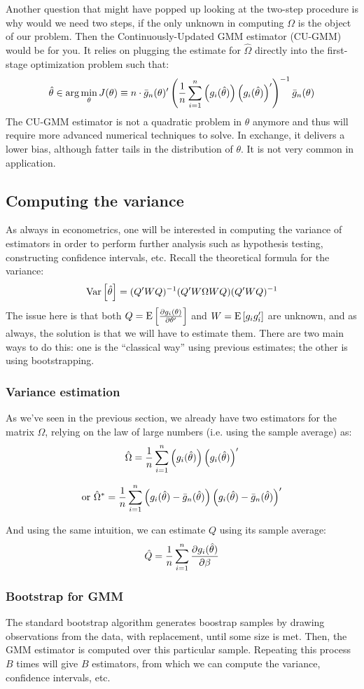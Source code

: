 Another question that might have popped up looking at the two-step procedure is why would we need two steps, if the only unknown in computing $\Omega$ is the object of our problem. Then the Continuously-Updated GMM estimator (CU-GMM) would be for you. It relies on plugging the estimate for $\hat\Omega$ directly into the first-stage optimization problem such that: $$ \hat\theta \in\arg\min_{\theta} J(\theta) \equiv n\cdot \bar g_n(\theta)'\left(\frac{1}{n} \sum_{i=1}^{n}\left(g_i(\hat\theta)\right)\left(g_i(\hat\theta)\right)'\right)^{-1}\bar g_n(\theta) $$
The CU-GMM estimator is not a quadratic problem in $\theta$ anymore and thus will require more advanced numerical techniques to solve. In exchange, it delivers a lower bias, although fatter tails in the distribution of $\theta$. It is not very common in application.

\subsection{Computing the variance}
 
As always in econometrics, one will be interested in computing the variance of estimators in order to perform further analysis such as hypothesis testing, constructing confidence intervals, etc. Recall the theoretical formula for the variance: $$ \operatorname{Var}\left[\hat\theta\right] = (Q'WQ)^{-1}(Q'W\Omega WQ)(Q'WQ)^{-1} $$ The issue here is that both $Q = \operatorname{E}\left[\frac{\partial g_i(\theta)}{\partial\theta'}\right]$ and $W = \operatorname{E}\left[g_ig_i'\right]$ are unknown, and as always, the solution is that we will have to estimate them. There are two main ways to do this: one is the ``classical way'' using previous estimates; the other is using bootstrapping.

\subsubsection{Variance estimation}

As we've seen in the previous section, we already have two estimators for the matrix $\Omega$, relying on the law of large numbers (i.e. using the sample average) as: $$\hat\Omega = \frac{1}{n} \sum_{i=1}^{n}\left(g_i(\hat\theta)\right)\left(g_i(\hat\theta)\right)' $$

$$\text{or } \hat\Omega^* = \frac{1}{n} \sum_{i=1}^{n}\left(g_i(\hat\theta) - \bar g_n(\hat\theta)\right)\left(g_i(\hat\theta) - \bar g_n(\hat\theta)\right)' $$

And using the same intuition, we can estimate $Q$ using its sample average: $$\hat Q = \frac{1}{n} \sum_{i=1}^{n} \frac{\partial g_i(\hat\theta)}{\partial \beta} $$

\subsubsection{Bootstrap for GMM}

The standard bootstrap algorithm generates boostrap samples by drawing observations from the data, with replacement, until some size is met. Then, the GMM estimator is computed over this particular sample. Repeating this process $B$ times will give $B$ estimators, from which we can compute the variance, confidence intervals, etc.

